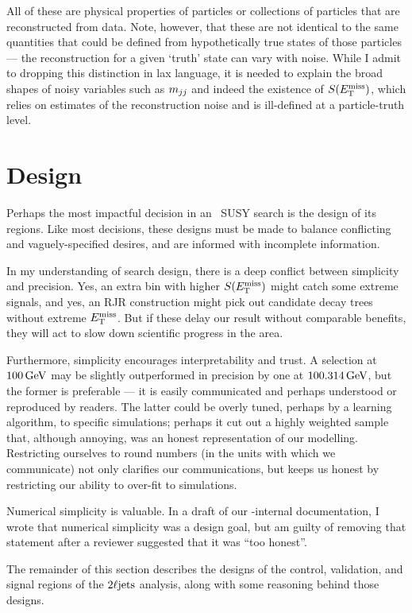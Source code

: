 All of these are physical properties of particles or collections of particles
that are reconstructed from data.
Note, however, that these are not identical to the same quantities that could
be defined from hypothetically true states of those particles ---
the reconstruction for a given `truth' state can vary with noise.
While I admit to dropping this distinction in lax language, it is needed to
explain the broad shapes of noisy variables such as $\mjj$ and indeed the
existence of $\metsig$, which relies on estimates of the reconstruction noise
and is ill-defined at a particle-truth level.


\FloatBarrier
\section{Design}
\label{sec:2ljets_design}
Perhaps the most impactful decision in an \atlas\ SUSY search is the design of
its regions.
Like most decisions, these designs must be made to balance conflicting and
vaguely-specified desires, and are informed with incomplete information.

In my understanding of search design, there is a deep conflict between
simplicity and precision.
Yes, an extra bin with higher $\metsig$ might catch some extreme signals,
and yes, an RJR construction might pick out candidate decay trees without
extreme $\met$.
But if these delay our result without comparable benefits, they will act to
slow down scientific progress in the area.

Furthermore, simplicity encourages interpretability and trust.
A selection at $100\,\eV[G]$ may be slightly outperformed in precision by one
at $100.314\,\eV[G]$, but the former is preferable --- it is easily
communicated and perhaps understood or reproduced by readers.
The latter could be overly tuned, perhaps by a learning algorithm, to specific
simulations; perhaps it cut out a highly weighted sample that, although
annoying, was an
honest representation of our modelling.
Restricting ourselves to round numbers (in the units with which we communicate)
not only clarifies our communications,
but keeps us honest by restricting our ability to over-fit to simulations.

Numerical simplicity is valuable.
In a draft of our \atlas-internal documentation, I wrote that numerical
simplicity was a design goal, but am guilty of removing that statement after a
reviewer suggested that it was ``too honest''.

The remainder of this section describes the designs of the control,
validation, and signal regions of the $\twoljets$ analysis, along with some
reasoning behind those designs.

